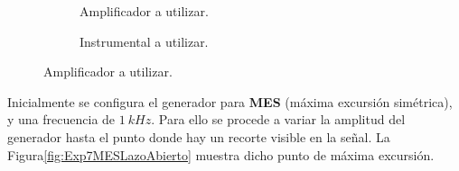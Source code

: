       \begin{figure}[H]
        \centering
        \begin{subfigure}[H]{0.48\textwidth}
          \caption{Amplificador a utilizar.}
          \label{fig:Exp7Amplificador}
        \end{subfigure}
        \hfill 
        \begin{subfigure}[H]{0.48\textwidth}
          \caption{Instrumental a utilizar.}
          \label{fig:Exp7Instrumental}
        \end{subfigure} 

          \caption{Amplificador a utilizar.}
          \label{fig:Exp7Circuito}
      \end{figure} 

    Inicialmente se configura el generador para \textbf{MES} (máxima excursión simétrica), y 
    una frecuencia de $1~kHz$. Para ello se procede a variar la amplitud del generador hasta 
    el punto donde hay un recorte visible en la señal. La Figura\ref{fig:Exp7MESLazoAbierto} 
    muestra dicho punto de máxima excursión.

